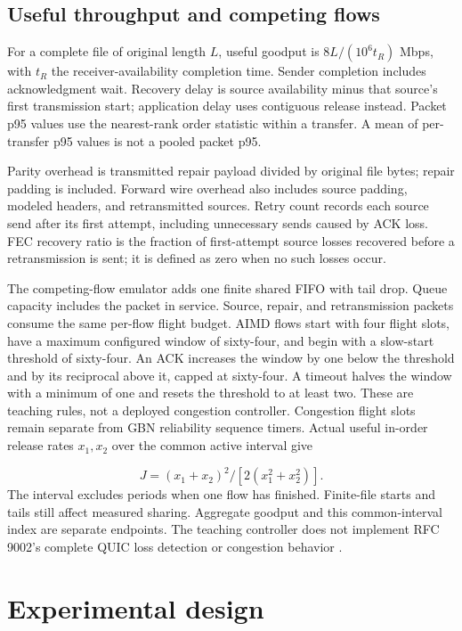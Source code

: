 \documentclass[11pt,a4paper]{article}
\begin{document}
\subsection{Useful throughput and competing flows}
For a complete file of original length $L$, useful goodput is $8L/(10^6t_R)$ Mbps, with $t_R$ the receiver-availability completion time. Sender completion includes acknowledgment wait. Recovery delay is source availability minus that source's first transmission start; application delay uses contiguous release instead. Packet p95 values use the nearest-rank order statistic within a transfer. A mean of per-transfer p95 values is not a pooled packet p95.

Parity overhead is transmitted repair payload divided by original file bytes; repair padding is included. Forward wire overhead also includes source padding, modeled headers, and retransmitted sources. Retry count records each source send after its first attempt, including unnecessary sends caused by ACK loss. FEC recovery ratio is the fraction of first-attempt source losses recovered before a retransmission is sent; it is defined as zero when no such losses occur.

The competing-flow emulator adds one finite shared FIFO with tail drop. Queue capacity includes the packet in service. Source, repair, and retransmission packets consume the same per-flow flight budget. AIMD flows start with four flight slots, have a maximum configured window of sixty-four, and begin with a slow-start threshold of sixty-four. An ACK increases the window by one below the threshold and by its reciprocal above it, capped at sixty-four. A timeout halves the window with a minimum of one and resets the threshold to at least two. These are teaching rules, not a deployed congestion controller. Congestion flight slots remain separate from GBN reliability sequence timers. Actual useful in-order release rates $x_1,x_2$ over the common active interval give

\[
J=(x_1+x_2)^2/[2(x_1^2+x_2^2)]. \tag{6}
\]
The interval excludes periods when one flow has finished. Finite-file starts and tails still affect measured sharing. Aggregate goodput and this common-interval index are separate endpoints. The teaching controller does not implement RFC 9002's complete QUIC loss detection or congestion behavior \cite{iyengar2021recovery}.

\section{Experimental design}
\end{document}
